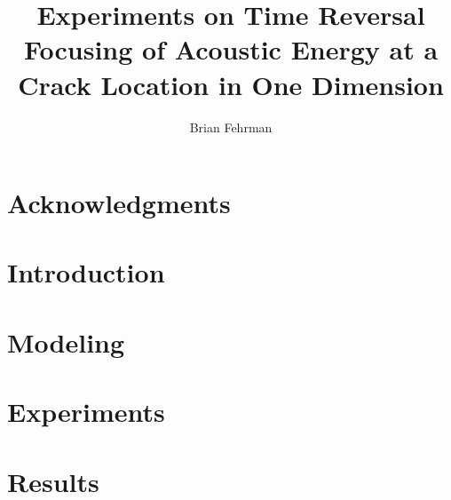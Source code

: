 \documentclass[12pt]{ucthesis}
\author{Brian Fehrman}
\title{Experiments on Time Reversal Focusing of Acoustic Energy at a Crack Location in One Dimension}
\begin{document}
\titlespacing{\chapter}{0pt}{-5pt}{-10pt}
\titlespacing{\section}{0pt}{0pt}{0pt}



\begin{frontmatter}
\begin{abstract}
\end{abstract}
\printglossary
\tableofcontents
\listoffigures
\end{frontmatter}

\chapter*{Acknowledgments}



\chapter{Introduction}\label{ch:Introduction}

\chapter{Modeling}\label{ch:Modeling}


\chapter{Experiments}\label{ch:Experiments}


\chapter{Results}\label{ch:Results}

\end{document}

